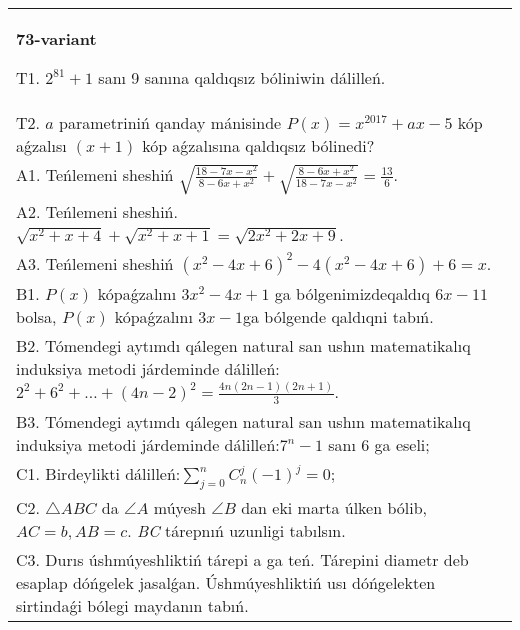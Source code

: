 \documentclass{article}
\begin{document}
\begin{tabular}{m{17cm}}
\textbf{73-variant}
\newline

T1. \(2^{81} + 1\) sanı 9 sanına qaldıqsız bóliniwin dálilleń. \\
T2. \(a\) parametriniń qanday mánisinde \(P(x) = x^{2017} + ax - 5\) kóp aǵzalısı \((x + 1)\) kóp aǵzalısına qaldıqsız bólinedi? \\
A1. Teńlemeni sheshiń \(\sqrt{\frac{18 - 7x - x^{2}}{8 - 6x + x^{2}}} + \sqrt{\frac{8 - 6x + x^{2}}{18 - 7x - x^{2}}} = \frac{13}{6}\). \\
A2. Teńlemeni sheshiń. \(\sqrt{x^{2} + x + 4} + \sqrt{x^{2} + x + 1} = \sqrt{2x^{2} + 2x + 9}\). \\
A3. Teńlemeni sheshiń \(\left( x^{2} - 4x + 6 \right)^{2} - 4\left( x^{2} - 4x + 6 \right) + 6 = x\). \\
B1. \(P(x)\) kópaǵzalını \(3x^{2} - 4x + 1\) ga bólgenimizdeqaldıq \(6x - 11\) bolsa, \(P(x)\) kópaǵzalını \(3x - 1\)ga bólgende qaldıqni tabıń. \\
B2. Tómendegi aytımdı qálegen natural san ushın matematikalıq induksiya metodi járdeminde dálilleń: \(2^{2} + 6^{2} + \ldots + (4n - 2)^{2} = \frac{4n(2n - 1)(2n + 1)}{3}\). \\
B3. Tómendegi aytımdı qálegen natural san ushın matematikalıq induksiya metodi járdeminde dálilleń:\(7^{n} - 1\) sanı 6 ga eseli; \\
C1. Birdeylikti dálilleń:\(\sum_{j = 0}^{n}C_{n}^{j}( - 1)^{j} = 0\); \\
C2. \(\bigtriangleup ABC\) da \(\angle A\) múyesh \(\angle B\) dan eki marta úlken bólib, \(AC = b,AB = c\). \emph{BC} tárepnıń uzunligi tabılsın. \\
C3. Durıs úshmúyeshliktiń tárepi a ga teń. Tárepini diametr deb esaplap dóńgelek jasalǵan. Úshmúyeshliktiń usı dóńgelekten sirtindaǵi bólegi maydanın tabıń. \\

\end{tabular}
\vspace{1cm}
\end{document}
